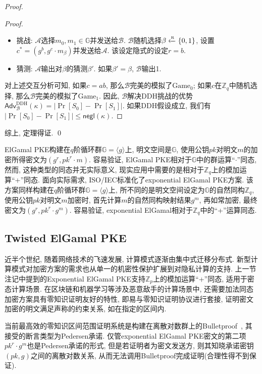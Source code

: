 \begin{proof}
\begin{proof}
\begin{itemize}
	\item 挑战: $\mathcal{A}$选择$m_0, m_1 \in \mathbb{G}$并发送给$\mathcal{B}$.  
		$\mathcal{B}$随机选择$\beta \xleftarrow{\textup{\tiny R}} \{0,1\}$, 
		设置$c^* = (g^b, g^c \cdot m_\beta)$并发送给$\mathcal{A}$. 该设定隐式的设定$r = b$.   

	\item 猜测: $\mathcal{A}$输出对$\beta$的猜测$\beta'$. 如果$\beta' = \beta$, $\mathcal{B}$输出1. 
\end{itemize} 
对上述交互分析可知, 如果$c = ab$, 那么$\mathcal{B}$完美的模拟了$\text{Game}_0$; 如果$c$在$\mathbb{Z}_q$中随机选择, 
那么$\mathcal{B}$完美的模拟了$\text{Game}_1$. 
因此, $\mathcal{B}$解决DDH挑战的优势$\mathsf{Adv}_\mathcal{B}^\text{DDH}(\kappa) = |\Pr[S_0]-\Pr[S_1]|$. 
如果DDH假设成立, 我们有$|\Pr[S_0]-\Pr[S_1]| \leq \mathsf{negl}(\kappa)$. 
\end{proof}
综上, 定理得证. \qed
\end{proof}

\begin{note}[具有实际应用价值的同态]
ElGamal PKE构建在$q$阶循环群$\mathbb{G} = \langle g \rangle$上, 明文空间是$\mathbb{G}$, 使用公钥$pk$对明文$m$的加密所得密文为$(g^r, pk^r \cdot m)$. 
容易验证, ElGamal PKE相对于$\mathbb{G}$中的群运算``$\cdot$''同态, 然而, 这种类型的同态并无实际意义, 
现实应用中需要的是相对于$\mathbb{Z}_q$上的模加运算``+''同态. 
面向实际需求, ISO/IEC标准化了exponential ElGamal PKE方案. 
该方案同样构建在$q$阶循环群$\mathbb{G} = \langle g \rangle$上, 所不同的是明文空间设定为$\mathbb{G}$的自然同构$\mathbb{Z}_q$, 
使用公钥$pk$对明文$m$加密时, 首先计算$m$的自然同构映射结果$g^m$, 再如常加密, 最终密文为$(g^r, pk^r \cdot g^m)$. 
容易验证, exponential ElGamal相对于$\mathbb{Z}_q$中的``+''运算同态. 
\end{note}

\subsection{Twisted ElGamal PKE}
近半个世纪, 随着网络技术的飞速发展, 计算模式逐渐由集中式迁移分布式. 新型计算模式对加密方案的需求也从单一的机密性保护扩展到对隐私计算的支持. 
上一节注记中提到的Exponential ElGamal PKE支持$\mathbb{Z}_p$上的模加运算``+''同态, 适用于密态计算场景. 
在区块链和机器学习等涉及恶意敌手的计算场景中, 还需要加法同态加密方案具有零知识证明友好的特性, 即易与零知识证明协议进行套接, 
证明密文加密的明文满足声称的约束关系, 如在指定的区间内. 

当前最高效的零知识区间范围证明系统是构建在离散对数群上的Bulletproof~\cite{Bunz-BulletProof-SP-2018}, 其接受的断言类型为Pedersen承诺. 
仅管exponential ElGamal PKE密文的第二项$pk^r \cdot g^m$也是Pedersen承诺的形式, 但是若证明者为密文发送方, 
则其知晓承诺密钥$(pk, g)$之间的离散对数关系, 从而无法调用Bulletproof完成证明(合理性得不到保证). 

